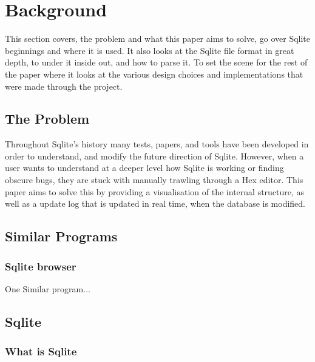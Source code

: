\section{Background}
\label{sec:background}

This section covers, the problem and what this paper aims to solve, go over Sqlite beginnings and where it is used. It also looks at the Sqlite file format in great depth, to under it inside out, and how to parse it. To set the scene for the rest of the paper where it looks at the various design choices and implementations that were made through the project.

\subsection{The Problem}
\label{subsec:the_problem}

Throughout Sqlite's history many tests, papers, and tools have been developed in order to understand, and modify the future direction of Sqlite. However, when a user wants to understand at a deeper level how Sqlite is working or finding obscure bugs, they are stuck with manually trawling through a Hex editor. This paper aims to solve this by providing a visualisation of the internal structure, as well as a update log that is updated in real time, when the database is modified.

\subsection{Similar Programs}
\label{subsec:similar_programs}

\subsubsection{Sqlite browser}
\label{subsubsec:sqlite_browser}

One Similar program...


\subsection{Sqlite}
\label{subsec:sqlite}

\subsubsection{What is Sqlite}
\label{subsubsec:what_is_sqlite}

